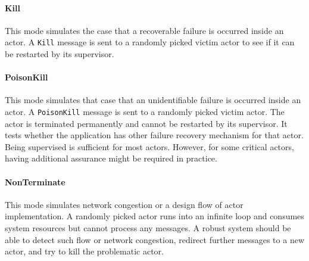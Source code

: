 \paragraph{Kill} This mode simulates the case that a recoverable failure is occurred
inside an actor.  A {\tt Kill} message is sent to a randomly picked victim actor to see
if it can be restarted by its supervisor.

\paragraph{PoisonKill} This mode simulates that case that an unidentifiable failure
is occurred inside an actor.  A {\tt PoisonKill} message is sent to a randomly
picked victim actor.  The actor is terminated permanently and cannot be restarted
by its supervisor.  It tests whether the application has other failure recovery
mechanism for that actor.  Being supervised is sufficient for most actors.  However,
for some critical actors, having additional assurance might be required in practice.

\paragraph{NonTerminate} This mode simulates network congestion or a design flow of
actor implementation.  A randomly picked actor runs into an infinite loop and
consumes system resources but cannot process any messages.  A robust system should be
able to detect such flow or network congestion, redirect further messages to a new
actor, and try to kill the problematic actor.

